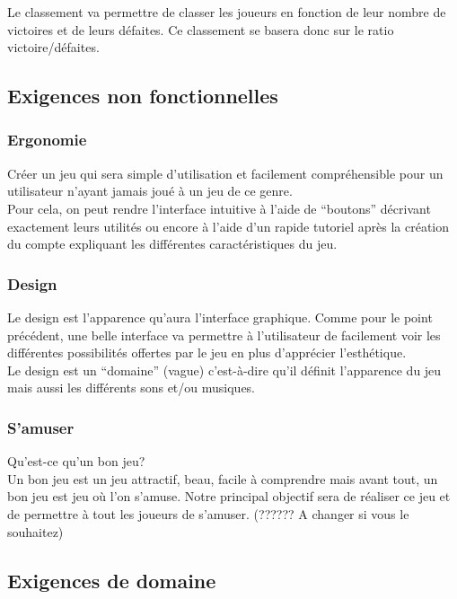 \documentclass[11pt,a4paper]{article}
\begin{document}
Le classement va permettre de classer les joueurs en fonction de
leur nombre de victoires et de leurs défaites. Ce classement se
basera donc sur le ratio victoire/défaites.


\subsection{Exigences non fonctionnelles}
\label{sec:exi-nonfonc}

\subsubsection{Ergonomie}
Créer un jeu qui sera simple d'utilisation et facilement compréhensible pour un utilisateur n'ayant jamais joué à un jeu de ce genre.\\
Pour cela, on peut rendre l'interface intuitive à l'aide de ``boutons'' décrivant exactement leurs utilités ou encore à l'aide d'un rapide tutoriel après la création du compte expliquant les différentes caractéristiques du jeu.

\subsubsection{Design}
Le design est l'apparence qu'aura l'interface graphique. Comme pour le point précédent, une belle interface va permettre à l'utilisateur de facilement voir les différentes possibilités offertes par le jeu en plus d'apprécier l’esthétique.\\
Le design est un ``domaine'' (vague) c'est-à-dire qu'il définit l'apparence du jeu mais aussi les différents sons et/ou musiques.

\subsubsection{S'amuser}
Qu'est-ce qu'un bon jeu?\\
Un bon jeu est un jeu attractif, beau, facile à comprendre mais avant tout, un bon jeu est jeu où l'on s'amuse. Notre principal objectif sera de réaliser ce jeu et de permettre à tout les joueurs de s'amuser. (?????? A changer si vous le souhaitez)


\subsection{Exigences de domaine}
\label{sec:exi-dom}
\end{document}
